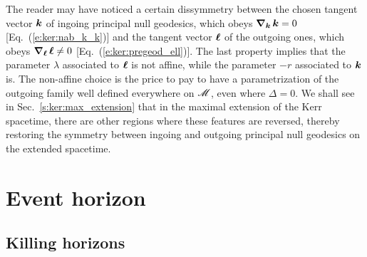 \begin{remark}
The reader may have noticed a certain dissymmetry between the chosen tangent vector
$\bm{k}$ of ingoing principal null geodesics, which obeys $\bm{\nabla}_{\bm{k}}\, \bm{k} = 0$
[Eq.~(\ref{e:ker:nab_k_k})] and the tangent vector $\bm{\ell}$ of the outgoing
ones, which obeys $\bm{\nabla}_{\bm{\ell}}\, \bm{\ell} \not= 0$ [Eq.~(\ref{e:ker:pregeod_ell})].
The last property implies that the
parameter $\lambda$ associated to $\bm{\ell}$ is not affine, while the
parameter $-r$ associated to $\bm{k}$ is.
The non-affine choice is the price to pay to have a parametrization of the outgoing
family well defined everywhere on $\mathscr{M}$, even where $\Delta=0$. We shall see in
Sec.~\ref{s:ker:max_extension} that in the maximal extension of the Kerr spacetime, there are other regions
where these features are reversed,
thereby restoring the symmetry between ingoing and outgoing principal null geodesics
on the extended spacetime.
\end{remark}


\section{Event horizon}

\subsection{Killing horizons} \label{s:ker:Killing_hor}

